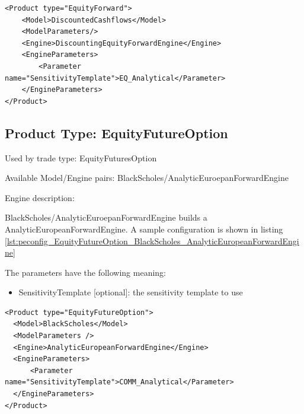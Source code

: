\begin{longlisting}
\begin{verbatim}
<Product type="EquityForward">
    <Model>DiscountedCashflows</Model>
    <ModelParameters/>
    <Engine>DiscountingEquityForwardEngine</Engine>
    <EngineParameters>
        <Parameter name="SensitivityTemplate">EQ_Analytical</Parameter>
    </EngineParameters>
</Product>
\end{verbatim}
\caption{Configuration for Product EquityForward, Model DiscountedCashflows, Engine DiscountingEquityForwardEngine}
\label{lst:peconfig_EquityForward_DiscountedCashflows_DiscountingEquityForwardEngine}
\end{longlisting}

\subsection{Product Type: EquityFutureOption}

Used by trade type: EquityFuturesOption

Available Model/Engine pairs: BlackScholes/AnalyticEuroepanForwardEngine

Engine description:

BlackScholes/AnalyticEuroepanForwardEngine builds a AnalyticEuropeanForwardEngine. A sample configuration is shown in
listing \ref{lst:peconfig_EquityFutureOption_BlackScholes_AnalyticEuropeanForwardEngine}

The parameters have the following meaning:

\begin{itemize}
\item SensitivityTemplate [optional]: the sensitivity template to use
\end{itemize}

\begin{longlisting}
\begin{verbatim}
<Product type="EquityFutureOption">
  <Model>BlackScholes</Model>
  <ModelParameters />
  <Engine>AnalyticEuropeanForwardEngine</Engine>
  <EngineParameters>
      <Parameter name="SensitivityTemplate">COMM_Analytical</Parameter>
  </EngineParameters>
</Product>
\end{verbatim}
\caption{Configuration for Product EquityFutureOption, Model BlackScholes, Engine AnalyticEuropeanForwardEngine}
\label{lst:peconfig_EquityFutureOption_BlackScholes_AnalyticEuropeanForwardEngine}
\end{longlisting}

